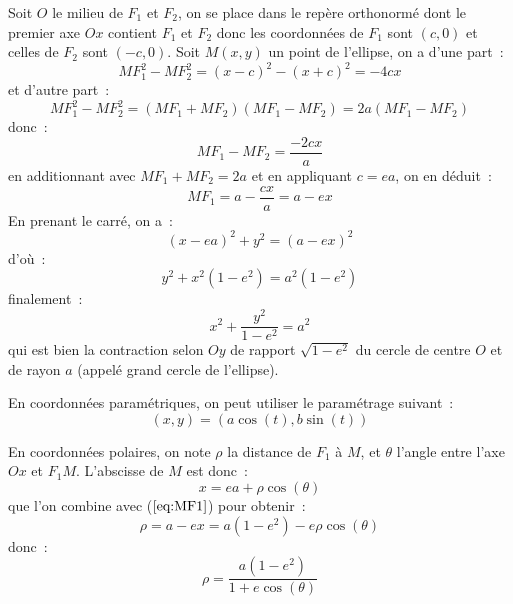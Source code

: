 \documentclass[a4paper,11pt]{article}
\begin{document}
\begin{giacjshere}
Soit $O$ le milieu de $F_1$ et $F_2$, on se place dans le rep\`ere 
orthonorm\'e
dont le premier axe $Ox$ contient $F_1$ et $F_2$ donc les
coordonn\'ees de $F_1$ sont $(c,0)$ et celles de $F_2$ sont $(-c,0)$. 
Soit $M(x,y)$ un
point de l'ellipse, on a d'une part~:
\[ MF_1^2 - MF_2^2 = (x-c)^2-(x+c)^2 = -4cx \]
et d'autre part~:
\[ MF_1^2 - MF_2^2 = (MF_1 + MF_2)(MF_1 - MF_2 ) = 2a (MF_1 - MF_2 )\]
donc~:
\[ MF_1 - MF_2 = \frac{-2cx}{a} \]
en additionnant avec $MF_1+MF_2=2a$ et en appliquant $c=ea$, on en d\'eduit~:
\begin{equation} \label{eq:MF1}
 MF_1 = a - \frac{cx}{a} = a-ex 
\end{equation}
En prenant le carr\'e, on a~:
\[ (x-ea)^2 + y^2 = (a-ex)^2\]
d'o\`u~:
\[ y^2 + x^2 (1-e^2) = a^2(1-e^2) \]
finalement~:
\[ x^2 + \frac{y^2}{1-e^2} = a^2 \]
qui est bien la contraction selon $Oy$ de rapport $\sqrt{1-e^2}$ du
cercle de centre $O$ et de rayon $a$ (appel\'e grand cercle de
l'ellipse).

En coordonn\'ees param\'etriques, on peut utiliser le param\'etrage suivant~:
$$ (x,y)=(a\cos(t),b\sin(t))$$

En coordonn\'ees polaires, on note $\rho$ la distance de $F_1$ \`a
$M$, et $\theta$ l'angle entre l'axe $Ox$ et $F_1M$. L'abscisse de $M$
est donc~:
\[ x= ea + \rho \cos(\theta)\]
que l'on combine avec (\(\ref{eq:MF1}\)) pour obtenir~:
\[ \rho = a-ex =a(1-e^2) - e \rho \cos(\theta) \]
donc~:
\[ \rho = \frac{a(1-e^2)}{1+e\cos(\theta)} \]


\end{giacjshere}
\end{document}
